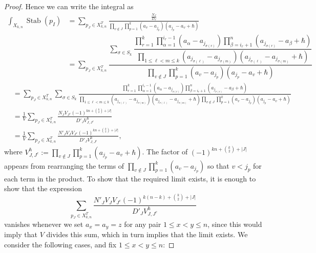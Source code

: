 \documentclass[12 pt]{article}
\theoremstyle{plain}
\theoremstyle{plain}
\theoremstyle{plain}
\theoremstyle{plain}
\theoremstyle{plain}
\theoremstyle{plain}
\theoremstyle{plain}
\theoremstyle{plain}
\theoremstyle{plain}
\theoremstyle{plain}
\theoremstyle{remark}
\theoremstyle{remark}
\theoremstyle{definition}
\theoremstyle{definition}
\theoremstyle{definition}
\theoremstyle{definition}
\theoremstyle{definition}
\theoremstyle{definition}
\DeclareMathOperator{\Stab}{Stab}
\begin{document}
\begin{proof}
Hence we can write the integral as
\begin{align*}
\int_{X_{k,n}}\Stab(p_{I})&=\sum_{p_{J}\in X_{k,n}^{T}}\frac{\frac{N_{J}}{D_{J}}}{\prod\limits_{v\not \in J} \prod\limits_{p = 1}^{k}(a_v - a_{j_p}) (a_{j_p}-a_v+\hbar)}\\
&=\sum_{p_J\in X_{k,n}^T}\dfrac{\sum\limits_{\sigma \in S_k} \dfrac{\prod\limits_{r = 1}^k \prod\limits_{\alpha = 1}^{i_{r} - 1} \left(a_{\alpha} - a_{j_{\sigma(r)}}\right) \prod\limits_{\beta = i_r + 1}^n \left(a_{j_{\sigma(r)}} - a_{\beta} + \hbar\right) }{\prod\limits_{1 \leq \ell < m \leq k} \left(a_{j_{\sigma(\ell)}} - a_{j_{\sigma(m)}}\right) \left(a_{j_{\sigma(\ell)}} - a_{j_{\sigma(m)}} + \hbar\right)}}{\prod\limits_{v\not \in J} \prod\limits_{p = 1}^{k}\left(a_v - a_{j_p}\right) \left(a_{j_p}-a_v+\hbar\right)}
\end{align*}
\begin{align*}
&=\sum_{p_J\in X_{k,n}^T}\sum\limits_{\sigma \in S_k} \frac{\prod\limits_{r = 1}^k \prod\limits_{\alpha = 1}^{i_{r} - 1} \left(a_{\alpha} - a_{j_{\sigma(r)}}\right) \prod\limits_{\beta = i_r + 1}^n \left(a_{j_{\sigma(r)}} - a_{\beta} + \hbar\right) }{\prod\limits_{1 \leq \ell < m \leq k} \left(a_{j_{\sigma(\ell)}} - a_{j_{\sigma(m)}}\right) \left(a_{j_{\sigma(\ell)}} - a_{j_{\sigma(m)}} + \hbar\right)\prod\limits_{v\not \in J} \prod\limits_{p = 1}^{k}\left(a_v - a_{j_p}\right) \left(a_{j_p}-a_v+\hbar\right)}\\
&=\frac{1}{V}\sum_{p_{J}\in X_{k,n}^{T}}\frac{N_{J}V_{J^{c}}(-1)^{kn+\binom{k}{2}+|J|}}{D'_{J}V_{J,J^{c}}^{\hbar}}\\
&=\frac{1}{V}\sum_{p_{J}\in X_{k,n}^{T}}\frac{N'_{J}V_{J}V_{J^{c}}(-1)^{kn+\binom{k}{2}+|J|}}{D'_{J}V_{J,J^{c}}^{\hbar}},
\end{align*}
where $V_{J,J^c}^{\hbar}:= \prod_{v \not \in J}\prod_{p = 1}^{k} \left(a_{j_p} - a_v + \hbar\right)$. The factor of $(-1)^{kn+\binom{k}{2}+|J|}$ appears from rearranging the terms of $\prod\limits_{v\notin J}\prod\limits_{p=1}^{k}\left(a_{v}-a_{j_{p}}\right)$ so that $v<j_{p}$ for each term in the product.\newline
To show that the required limit exists, it is enough to show that the expression 
\begin{equation}\label{eq:thesum}\sum_{p_{J}\in X_{k,n}^{T}}\frac{N'_{J}V_{J}V_{J^{c}}(-1)^{k(n-k)+\binom{k}{2}+|J|}}{D'_{J}V_{J,J^{c}}^{\hbar}}\end{equation}
vanishes whenever we set $a_{x}=a_{y}=z$ for any pair $1\leq x<y\leq n$, since this would imply that $V$ divides this sum, which in turn implies that the limit exists. We consider the following cases, and fix $1\leq x<y\leq n$:\newline



\end{proof}
\end{document}
